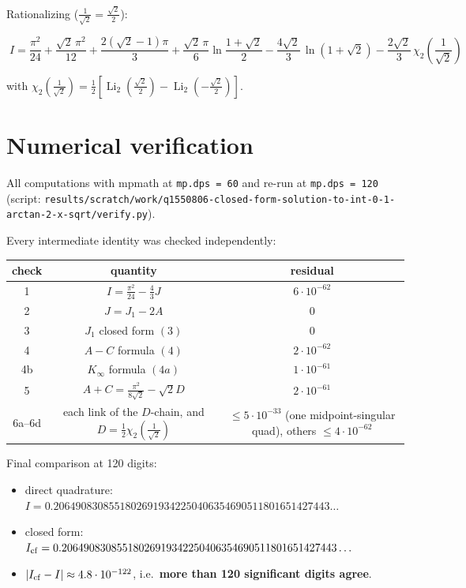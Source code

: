 \documentclass[11pt]{article}
\theoremstyle{remark}
\begin{document}
Rationalizing ($\tfrac{1}{\sqrt2}=\tfrac{\sqrt2}{2}$):

\[\boxed{\;I=\frac{\pi^2}{24}+\frac{\sqrt2\,\pi^2}{12}+\frac{2(\sqrt2-1)\pi}{3}
+\frac{\sqrt2\,\pi}{6}\ln\frac{1+\sqrt2}{2}
-\frac{4\sqrt2}{3}\,\ln(1+\sqrt2)
-\frac{2\sqrt2}{3}\,\chi_2\!\left(\frac{1}{\sqrt2}\right)\;}\]

with $\chi_2\!\left(\frac1{\sqrt2}\right)=\frac12\left[\operatorname{Li}_2\!\left(\frac{\sqrt2}{2}\right)-\operatorname{Li}_2\!\left(-\frac{\sqrt2}{2}\right)\right]$.

\section*{Numerical verification}

All computations with mpmath at \texttt{mp.dps = 60} and re-run at \texttt{mp.dps = 120}
(script: \texttt{results/scratch/work/q1550806-closed-form-solution-to-int-0-1-arctan-2-x-sqrt/verify.py}).

Every intermediate identity was checked independently:

\begin{center}
\begin{tabular}{|c|c|c|}
\hline
check & quantity & residual \\
\hline
1 & $I=\frac{\pi^2}{24}-\frac43J$ & $6\cdot10^{-62}$ \\
2 & $J=J_1-2A$ & $0$ \\
3 & $J_1$ closed form $(3)$ & $0$ \\
4 & $A-C$ formula $(4)$ & $2\cdot10^{-62}$ \\
4b & $K_\infty$ formula $(4a)$ & $1\cdot10^{-61}$ \\
5 & $A+C=\frac{\pi^2}{8\sqrt2}-\sqrt2 D$ & $2\cdot10^{-61}$ \\
6a--6d & each link of the $D$-chain, and $D=\frac12\chi_2(\tfrac1{\sqrt2})$ & $\le5\cdot10^{-33}$ (one midpoint-singular quad), others $\le4\cdot10^{-62}$ \\
\hline
\end{tabular}
\end{center}

Final comparison at 120 digits:

\begin{itemize}
\item direct quadrature: $I=0.20649083085518026919342250406354690511801651427443\ldots$
\item closed form: $I_{\rm cf}=0.20649083085518026919342250406354690511801651427443\ldots$
\item $|I_{\rm cf}-I|\approx4.8\cdot10^{-122}$, i.e.\ \textbf{more than 120 significant digits agree}.
\end{itemize}
\end{document}

